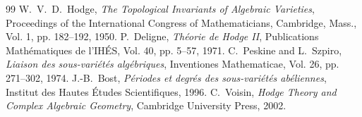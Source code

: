 \documentclass[11pt,a4paper]{article}
\theoremstyle{definition}
\begin{document}
\begin{thebibliography}{99}
 W.~V.~D.~Hodge, \emph{The Topological Invariants of Algebraic Varieties}, Proceedings of the International Congress of Mathematicians, Cambridge, Mass., Vol. 1, pp. 182--192, 1950.
 P.~Deligne, \emph{Th\'eorie de Hodge II}, Publications Math\'ematiques de l'IH\'ES, Vol. 40, pp. 5--57, 1971.
 C.~Peskine and L.~Szpiro, \emph{Liaison des sous-vari\'et\'es alg\'ebriques}, Inventiones Mathematicae, Vol. 26, pp. 271--302, 1974.
 J.-B.~Bost, \emph{P\'eriodes et degr\'es des sous-vari\'et\'es ab\'eliennes}, Institut des Hautes \'Etudes Scientifiques, 1996.
 C.~Voisin, \emph{Hodge Theory and Complex Algebraic Geometry}, Cambridge University Press, 2002.
\end{thebibliography}
\end{document}
